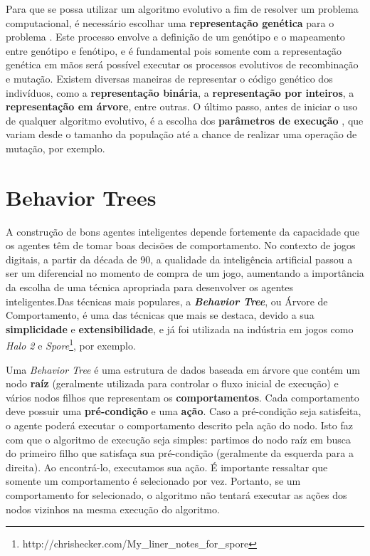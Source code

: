 Para que se possa utilizar um algoritmo evolutivo a fim de resolver um problema
computacional, é necessário escolhar uma \textbf{representação genética} para o
problema \cite[Cap. 4]{IntroEvolComputing}. Este processo envolve a definição de
um genótipo e o mapeamento entre genótipo e fenótipo, e é fundamental pois
somente com a representação genética em mãos será possível executar os processos
evolutivos de recombinação e mutação. Existem diversas maneiras de representar o
código genético dos indivíduos, como a \textbf{representação binária}, a
\textbf{representação por inteiros}, a \textbf{representação em árvore}, entre
outras. O último passo, antes de iniciar o uso de qualquer algoritmo evolutivo,
é a escolha dos \textbf{parâmetros de execução} \cite[Cap.
7]{IntroEvolComputing}, que variam desde o tamanho da população até a chance de
realizar uma operação de mutação, por exemplo.


\section{\label{section:behavior-trees}Behavior Trees}
A construção de bons agentes inteligentes depende fortemente da capacidade que
os agentes têm de tomar boas decisões de comportamento. No contexto de jogos
digitais, a partir da década de 90, a qualidade da inteligência artificial
passou a ser um diferencial no momento de compra de um jogo\cite[Cap.
1]{Millington:2009:AIG:1795711}, aumentando a importância da escolha de uma
técnica apropriada para desenvolver os agentes inteligentes.Das técnicas mais
populares, a \textbf{\textit{Behavior Tree}}, ou Árvore de Comportamento, é uma
das técnicas que mais se destaca, devido a sua \textbf{simplicidade} e
\textbf{extensibilidade}\cite[Cap.  4]{Rabin:2013:GAP:2566761}, e já foi
utilizada na indústria em jogos como \textit{Halo 2}\cite[Cap.
5]{Millington:2009:AIG:1795711} e
\textit{Spore}\footnote{http://chrishecker.com/My\_liner\_notes\_for\_spore},
por exemplo.

Uma \textit{Behavior Tree} é uma estrutura de dados baseada em árvore que contém
um nodo \textbf{raíz} (geralmente utilizada para controlar o fluxo inicial de
execução) e vários nodos filhos que representam os \textbf{comportamentos}. Cada
comportamento deve possuir uma \textbf{pré-condição} e uma \textbf{ação}. Caso a
pré-condição seja satisfeita, o agente poderá executar o comportamento descrito
pela ação do nodo\cite[Cap. 4]{Rabin:2013:GAP:2566761}. Isto faz com que o
algoritmo de execução seja simples: partimos do nodo raíz em busca do primeiro
filho que satisfaça sua pré-condição (geralmente da esquerda para a direita). Ao
encontrá-lo, executamos sua ação. É importante ressaltar que somente um
comportamento é selecionado por vez. Portanto, se um comportamento for
selecionado, o algoritmo não tentará executar as ações dos nodos vizinhos na
mesma execução do algoritmo.

